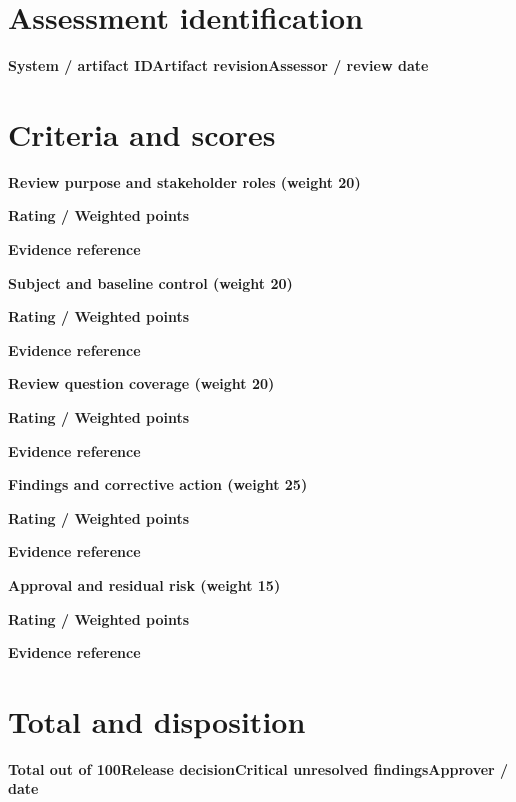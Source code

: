\documentclass[10pt,letterpaper]{article}
\begin{document}
\DocProvenance
\section{Assessment identification}
\textbf{System / artifact ID}\textbf{Artifact revision}\textbf{Assessor / review date}
\section{Criteria and scores}
\textbf{Review purpose and stakeholder roles (weight 20)}\par\textbf{Rating / Weighted points}\par{}\textbf{Evidence reference}\par{}
\textbf{Subject and baseline control (weight 20)}\par\textbf{Rating / Weighted points}\par{}\textbf{Evidence reference}\par{}
\textbf{Review question coverage (weight 20)}\par\textbf{Rating / Weighted points}\par{}\textbf{Evidence reference}\par{}
\textbf{Findings and corrective action (weight 25)}\par\textbf{Rating / Weighted points}\par{}\textbf{Evidence reference}\par{}
\textbf{Approval and residual risk (weight 15)}\par\textbf{Rating / Weighted points}\par{}\textbf{Evidence reference}\par{}
\section{Total and disposition}
\textbf{Total out of 100}\textbf{Release decision}\textbf{Critical unresolved findings}\textbf{Approver / date}
\end{document}
